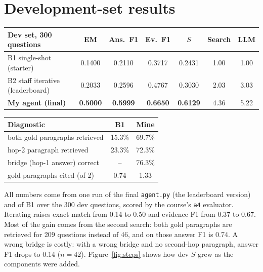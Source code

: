 \documentclass[10pt,a4paper]{article}
\begin{document}
\section{Development-set results}
\begin{minipage}[t]{0.585\textwidth}
\vspace{0pt}
\centering\footnotesize
\begin{tabular}{@{}lcccccc@{}}
\toprule
Dev set, 300 questions & EM & Ans.\ F1 & Ev.\ F1 & $S$ & Search & LLM\\
\midrule
B1 single-shot (starter) & 0.1400 & 0.2110 & 0.3717 & 0.2431 & 1.00 & 1.00\\
B2 staff iterative (leaderboard) & 0.2033 & 0.2596 & 0.4767 & 0.3030 & 2.03 & 3.03\\
\textbf{My agent (final)} & \textbf{0.5000} & \textbf{0.5999} & \textbf{0.6650} & \textbf{0.6129} & 4.36 & 5.22\\
\bottomrule
\end{tabular}
\label{tab:main}
\end{minipage}\hfill
\begin{minipage}[t]{0.395\textwidth}
\vspace{0pt}
\centering\footnotesize
\begin{tabular}{@{}lcc@{}}
\toprule
Diagnostic & B1 & Mine\\
\midrule
both gold paragraphs retrieved & 15.3\% & 69.7\%\\
hop-2 paragraph retrieved & 23.3\% & 72.3\%\\
bridge (hop-1 answer) correct & -- & 76.3\%\\
gold paragraphs cited (of 2) & 0.74 & 1.33\\
\bottomrule
\end{tabular}
\end{minipage}

\smallskip
All numbers come from one run of the final \texttt{agent.py} (the leaderboard version) and of B1 over the 300 dev
questions, scored by the course's \texttt{a4} evaluator. Iterating raises exact match from 0.14 to 0.50 and evidence F1
from 0.37 to 0.67. Most of the gain comes from the second search: both gold paragraphs are retrieved for 209
questions instead of 46, and on those answer F1 is 0.74. A wrong bridge is costly: with a wrong bridge and no
second-hop paragraph, answer F1 drops to 0.14 ($n{=}42$). Figure~\ref{fig:steps} shows how dev $S$ grew as the
components were added.
\end{document}
